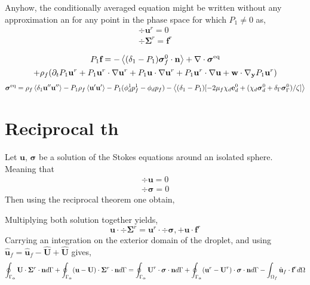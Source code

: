 \documentclass[12pt]{My_preprint}
\begin{document}
Anyhow, the conditionally averaged equation might be written without any approximation an for any point in the phase space for which $P_1 \neq 0$ as, 
\begin{align*}
    \div \textbf{u}^r = 0 \\
    \div \bm\Sigma^r
    = 
    \textbf{f}^r
\end{align*}

\begin{multline}
    P_1 \textbf{f}
    = 
    - \left<(\delta_1 - P_1) \bm\sigma_f^0 \cdot \textbf{n}\right>
    + \mathbf{\nabla}\cdot \bm\sigma^\text{eq} \\
    +    \rho_f (\partial_t P_1 \textbf{u}^r 
    + P_1 \textbf{u}^r \cdot \mathbf{\nabla} \textbf{u}^r 
    + P_1 \textbf{u} \cdot \mathbf{\nabla} \textbf{u}^r 
    + P_1 \textbf{u}^r \cdot \mathbf{\nabla} \textbf{u}
    + \textbf{w} \cdot {\mathbf{\nabla}_\textbf{y}} P_1 \textbf{u}^r )
\end{multline}
\begin{equation}
    \bm\sigma^\text{eq}
    =
    \rho_f \left<\delta_1 \textbf{u}''\textbf{u}''\right>
    - P_1\rho_f \left<\textbf{u}'\textbf{u}'\right>
    - P_1(\phi_d^1 p_f^1 - \phi_d p_f) 
    - \left<
        (\delta_1 - P_1)[
            -2 \mu_f \chi_d \textbf{e}_d^0
            + (\chi_d \bm\sigma_d^0
            + \delta_\Gamma \bm\sigma_\Gamma^0)/\zeta
        ]
    \right>
\end{equation}

\section{Reciprocal th}
Let $\textbf{u}$, $\bm\sigma$ be a solution of the Stokes equations around an isolated sphere. 
Meaning that 
\begin{align}
    \div \textbf{u} = 0 \\
    \div \bm\sigma = 0 
\end{align}
Then using the reciprocal theorem one obtain, 

Multiplying both solution together yields, 
\begin{equation*}
    \textbf{u}\cdot \div\bm\Sigma^r
    =
    \textbf{u}^r \cdot \div \bm\sigma, 
    + \textbf{u} \cdot  \textbf{f}^r
\end{equation*}
Carrying an integration on the exterior domain of the droplet, and using $\hat{\textbf{u}}_f =\hat{\textbf{u}}_f  - \hat{\textbf{U}} + \hat{\textbf{U}}$ gives, 
\begin{equation}
    \intS{\textbf{U} \cdot  \bm\Sigma^r \cdot \textbf{n}}
    + \intS{(\textbf{u} - \textbf{U})\cdot  \bm\Sigma^r \cdot \textbf{n}}
    = 
    \intS{\textbf{U}^r \cdot  \bm\sigma \cdot \textbf{n}}
    + \intS{(\textbf{u}^r - \textbf{U}^r)\cdot  \bm\sigma \cdot \textbf{n}}
    - \intOf{\hat{\textbf{u}}_f\cdot  \textbf{f}^r}
    \label{eq:stepone}
\end{equation}
\end{document}
